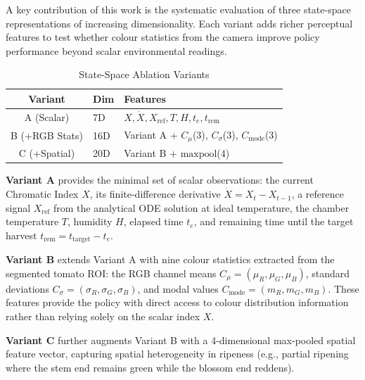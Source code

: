 A key contribution of this work is the systematic evaluation of three state-space representations of increasing dimensionality. Each variant adds richer perceptual features to test whether colour statistics from the camera improve policy performance beyond scalar environmental readings.

\begin{table}[htbp]
\caption{State-Space Ablation Variants}
\label{tab:state_variants}
\centering
\begin{tabular}{@{}clp{4.2cm}@{}}
\toprule
\textbf{Variant} & \textbf{Dim} & \textbf{Features} \\
\midrule
A (Scalar) & 7D & $X, \dot{X}, X_{\text{ref}}, T, H, t_e, t_{\text{rem}}$ \\
\addlinespace
B (+RGB Stats) & 16D & Variant A + $C_\mu$(3), $C_\sigma$(3), $C_{\text{mode}}$(3) \\
\addlinespace
C (+Spatial) & 20D & Variant B + $\text{maxpool}$(4) \\
\bottomrule
\end{tabular}
\end{table}

\textbf{Variant A} provides the minimal set of scalar observations: the current Chromatic Index $X$, its finite-difference derivative $\dot{X} = X_t - X_{t-1}$, a reference signal $X_{\text{ref}}$ from the analytical ODE solution at ideal temperature, the chamber temperature $T$, humidity $H$, elapsed time $t_e$, and remaining time until the target harvest $t_{\text{rem}} = t_{\text{target}} - t_e$.

\textbf{Variant B} extends Variant A with nine colour statistics extracted from the segmented tomato ROI: the RGB channel means $C_\mu = (\mu_R, \mu_G, \mu_B)$, standard deviations $C_\sigma = (\sigma_R, \sigma_G, \sigma_B)$, and modal values $C_{\text{mode}} = (m_R, m_G, m_B)$. These features provide the policy with direct access to colour distribution information rather than relying solely on the scalar index $X$.

\textbf{Variant C} further augments Variant B with a 4-dimensional max-pooled spatial feature vector, capturing spatial heterogeneity in ripeness (e.g., partial ripening where the stem end remains green while the blossom end reddens).


